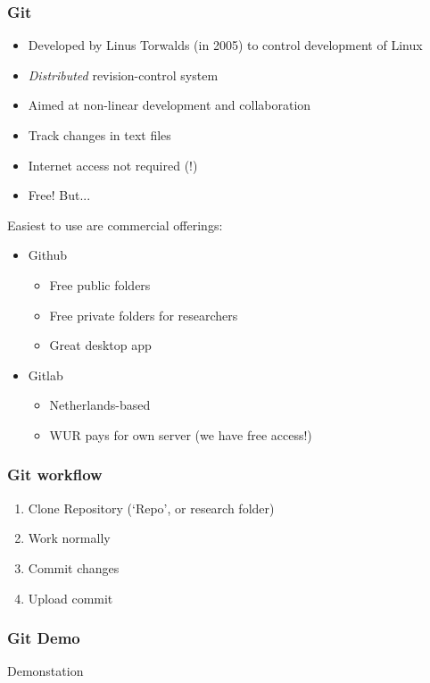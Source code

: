 \documentclass{beamer}
\begin{document}
\begin{frame}[t]\frametitle{Git}
	\begin{itemize}
		\item Developed by Linus Torwalds (in 2005) to control development of Linux
		\item \emph{Distributed} revision-control system
		\item Aimed at non-linear development and collaboration
		\item Track changes in text files
		\item Internet access not required (!)
		\item Free! But...
	\end{itemize}

	Easiest to use are commercial offerings:
		
	\begin{itemize}
		\item Github
		\begin{itemize}
			\item Free public folders
			\item Free private folders for researchers 
			\item Great desktop app
		\end{itemize}
		\item Gitlab
		\begin{itemize}
			\item Netherlands-based
			\item WUR pays for own server (we have free access!)
		\end{itemize}
	\end{itemize}
\end{frame}

\begin{frame}[t]\frametitle{Git workflow}
	\begin{enumerate}
		\item Clone Repository (`Repo', or research folder)
		\item Work normally
		\item Commit changes
		\item Upload commit
	\end{enumerate}
\end{frame}

\begin{frame}[t]\frametitle{Git Demo}
	Demonstation %
\end{frame}
\end{document}
